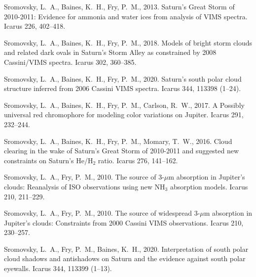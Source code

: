 \documentclass[article,11pt]{emulateapj}
\begin{document}
\begin{thebibliography}{85}
{Sromovsky}, L.~A., {Baines}, K.~H., {Fry}, P.~M., 2013. {Saturn's Great Storm
  of 2010-2011: Evidence for ammonia and water ices from analysis of VIMS
  spectra}. Icarus 226, 402--418.

{Sromovsky}, L.~A., {Baines}, K.~H., {Fry}, P.~M., 2018. {Models of bright
  storm clouds and related dark ovals in Saturn's Storm Alley as constrained by
  2008 Cassini/VIMS spectra}. Icarus 302, 360--385.

{Sromovsky}, L.~A., {Baines}, K.~H., {Fry}, P.~M., 2020{}.
  {Saturn's south polar cloud structure inferred from 2006 Cassini VIMS
  spectra}. Icarus 344, 113398 (1--24).

{Sromovsky}, L.~A., {Baines}, K.~H., {Fry}, P.~M., {Carlson}, R.~W., 2017. {A
  Possibly universal red chromophore for modeling color variations on Jupiter}.
  Icarus 291, 232--244.

{Sromovsky}, L.~A., {Baines}, K.~H., {Fry}, P.~M., {Momary}, T.~W., 2016.
  {Cloud clearing in the wake of Saturn's Great Storm of 2010-2011 and
  suggested new constraints on Saturn's He/H$_{2}$ ratio}. Icarus 276,
  141--162.

{Sromovsky}, L.~A., {Fry}, P.~M., 2010{}. {The source of 3-{$\mu$}m
  absorption in Jupiter's clouds: Reanalysis of ISO observations using new
  NH$_{3}$ absorption models}. Icarus 210, 211--229.

{Sromovsky}, L.~A., {Fry}, P.~M., 2010{}. {The source of widespread
  3-{$\mu$}m absorption in Jupiter's clouds: Constraints from 2000 Cassini VIMS
  observations}. Icarus 210, 230--257.

{Sromovsky}, L.~A., {Fry}, P.~M., {Baines}, K.~H., 2020{}.
  {Interpretation of south polar cloud shadows and antishadows on Saturn and
  the evidence against south polar eyewalls}. Icarus 344, 113399 (1--13).


\end{thebibliography}
\end{document}
